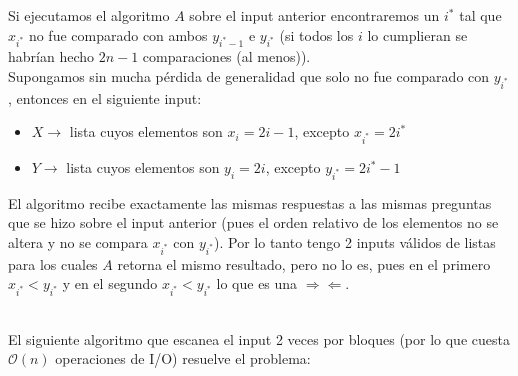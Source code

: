 \documentclass[dcc,uchile]{fcfmcourse}
\theoremstyle{plain}
\theoremstyle{definition}
\begin{document}
\begin{problems}
\begin{enumerate}[a)]
    Si ejecutamos el algoritmo $A$ sobre el input anterior encontraremos un $i^*$ tal que $x_{i^*}$ no fue comparado con ambos $y_{i^*-1}$ e $y_{i^*}$ (si todos los $i$ lo cumplieran se habrían hecho $2n-1$ comparaciones (al menos)).\\
    Supongamos sin mucha pérdida de generalidad que solo no fue comparado con $y_{i^*}$, entonces en el siguiente input:
    \begin{itemize}
        \item $X \rightarrow$ lista cuyos elementos son $x_{i} = 2i-1$, excepto $x_{i^*} = 2i^*$
        \item $Y \rightarrow$ lista cuyos elementos son $y_{i} = 2i$, excepto $y_{i^*} = 2i^*-1$
    \end{itemize}
    El algoritmo recibe exactamente las mismas respuestas a las mismas preguntas que se hizo sobre el input anterior (pues el orden relativo de los elementos no se altera y no se compara $x_{i^*}$ con $y_{i^*}$). Por lo tanto tengo 2 inputs válidos de listas para los cuales $A$ retorna el mismo resultado, pero no lo es, pues en el primero $x_{i^*} < y_{i^*}$ y en el segundo $x_{i^*} < y_{i^*}$ lo que es una $\Rightarrow \Leftarrow$.
\end{enumerate}
\\
El siguiente algoritmo que escanea el input 2 veces por bloques (por lo que cuesta $\mathcal{O}(n)$ operaciones de I/O) resuelve el problema:\\


\end{problems}
\end{document}
